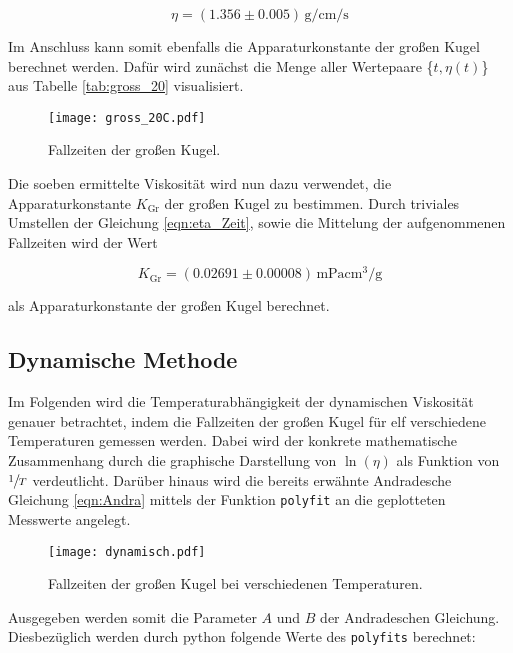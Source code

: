 \begin{equation}
\label{eqn:Viskositaet}
    \eta = (1.356 \pm 0.005)\,\unit{\gram\per\centi\meter\per\second}
\end{equation}

\noindent Im Anschluss kann somit ebenfalls die Apparaturkonstante der großen Kugel berechnet werden. Dafür wird zunächst die Menge 
aller Wertepaare \{$t,\eta(t)$\} aus Tabelle \ref{tab:gross_20} visualisiert.

\begin{figure}[H]
    \centering
    \texttt{[image: gross\_20C.pdf]}
    \caption{Fallzeiten der großen Kugel.}
\end{figure}

\noindent Die soeben ermittelte Viskosität wird nun dazu verwendet, die Apparaturkonstante $K_\text{Gr}$ der großen Kugel zu 
bestimmen. Durch triviales Umstellen der Gleichung \eqref{eqn:eta_Zeit}, sowie die Mittelung der aufgenommenen Fallzeiten wird 
der Wert 

\begin{equation*}
    K_\text{Gr} = \left(0.02691 \pm 0.00008\right)\,\unit{\milli\pascal\centi\cubic\meter\per\gram}
\end{equation*}

\noindent als Apparaturkonstante der großen Kugel berechnet.

\subsection{Dynamische Methode}

Im Folgenden wird die Temperaturabhängigkeit der dynamischen Viskosität genauer betrachtet, indem die Fallzeiten 
der großen Kugel für elf verschiedene Temperaturen gemessen werden. Dabei wird der konkrete mathematische Zusammenhang 
durch die graphische Darstellung von $\ln(\eta)$ als Funktion von $\sfrac{1}{T}$ verdeutlicht. Darüber hinaus wird die 
bereits erwähnte Andradesche Gleichung \eqref{eqn:Andra} mittels der Funktion \texttt{polyfit} an die geplotteten Messwerte 
angelegt.

\begin{figure}[H]
    \centering
    \texttt{[image: dynamisch.pdf]}
    \caption{Fallzeiten der großen Kugel bei verschiedenen Temperaturen.}
\end{figure}

\noindent Ausgegeben werden somit die Parameter $A$ und $B$ der Andradeschen Gleichung. Diesbezüglich werden durch 
python folgende Werte des \texttt{polyfits} berechnet:

